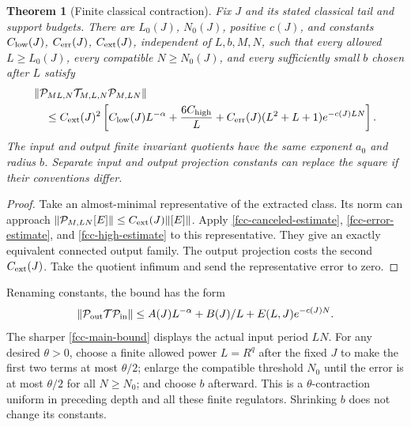 \documentclass[11pt]{article}
\newtheorem{theorem}{Theorem}[section]
\theoremstyle{remark}
\begin{document}
\begin{theorem}[Finite classical contraction]
\label{fcc-theorem}
Fix \(J\) and its stated classical tail and support
budgets. There are \(L_0(J)\), \(N_0(J)\), positive
\(c(J)\), and constants \(C_{\rm low}(J)\),
\(C_{\rm err}(J)\), \(C_{\rm ext}(J)\), independent
of \(L,b,M,N\), such that every allowed
\(L\ge L_0(J)\), every compatible \(N\ge N_0(J)\),
and every sufficiently small \(b\) chosen after \(L\)
satisfy
\begin{align}
 &\|\mathcal P_{ML,N}\mathcal T_{M,L,N}
                              \mathcal P_{M,LN}\|\notag\\
 &\quad\le C_{\rm ext}(J)^2
       \left[
       C_{\rm low}(J)L^{-\alpha}
       +\frac{6C_{\rm high}}L
       +C_{\rm err}(J)(L^2+L+1)e^{-c(J)LN}\right].
 \label{fcc-main-bound}
\end{align}
The input and output finite invariant quotients have
the same exponent \(a_0\) and radius \(b\).
Separate input and output projection constants can
replace the square if their conventions differ.
\end{theorem}

\begin{proof}
Take an almost-minimal representative of the extracted
class. Its norm can approach
\(\|\mathcal P_{M,LN}[E]\|\le C_{\rm ext}(J)\|[E]\|\).
Apply \eqref{fcc-canceled-estimate},
\eqref{fcc-error-estimate}, and
\eqref{fcc-high-estimate} to this representative.
They give an exactly equivalent connected output
family. The output projection costs the second
\(C_{\rm ext}(J)\). Take the quotient infimum and
send the representative error to zero.
\end{proof}

Renaming constants, the bound has the form
\begin{equation}
 \|\mathcal P_{\rm out}\mathcal T\mathcal P_{\rm in}\|
 \le A(J)L^{-\alpha}+B(J)/L
                       +E(L,J)e^{-c(J)N}.
 \label{fcc-renamed-bound}
\end{equation}
The sharper \eqref{fcc-main-bound} displays the actual
input period \(LN\). For any desired \(\theta>0\),
choose a finite allowed power \(L=R^q\) after the
fixed \(J\) to make the first two terms at most
\(\theta/2\); enlarge the compatible threshold
\(N_0\) until the error is at most \(\theta/2\) for
all \(N\ge N_0\); and choose \(b\) afterward.
This is a \(\theta\)-contraction uniform in preceding
depth and all these finite regulators. Shrinking
\(b\) does not change its constants.
\end{document}
